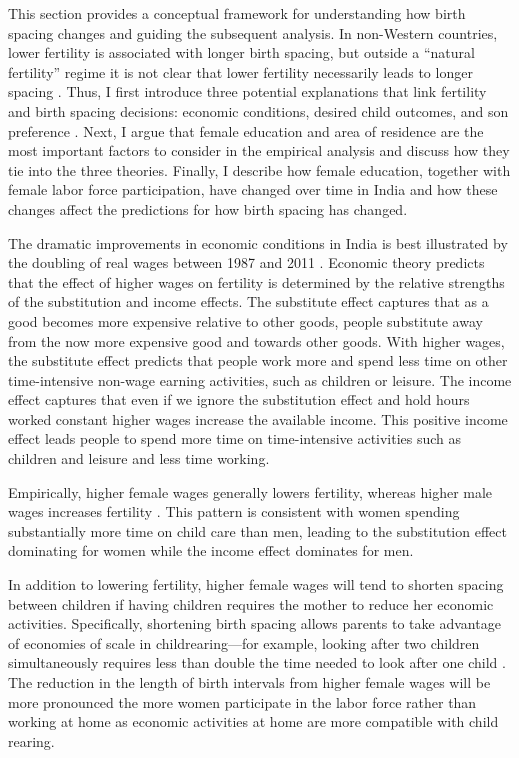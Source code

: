 This section provides a conceptual framework for understanding how birth spacing changes
and guiding the subsequent analysis.
In non-Western countries, lower fertility is associated with longer birth spacing, but 
outside a ``natural fertility'' regime it is not clear that lower fertility necessarily 
leads to longer spacing \citet{Newman1988,Rutstein2011,Casterline2016}.
Thus, I first introduce three potential explanations that link fertility and birth 
spacing decisions: economic conditions, desired child outcomes, and son preference 
\citep{Casterline2016,Portner2018}.
Next, I argue that female education and area of residence are the most important factors 
to consider in the empirical analysis and discuss how they tie into the three theories.
Finally, I describe how female education, together with female labor force participation, 
have changed over time in India and how these changes affect the predictions for how birth 
spacing has changed.

The dramatic improvements in economic conditions in India is best illustrated by the 
doubling of real wages between 1987 and 2011 \citep{Klasen2015}.
Economic theory predicts that the effect of higher wages on fertility is determined by 
the relative strengths of the substitution and income effects.
The substitute effect captures that as a good becomes more expensive relative to other
goods, people substitute away from the now more expensive good and towards other goods.
With higher wages, the substitute effect predicts that people work more and spend less 
time on other time-intensive non-wage earning activities, such as children or leisure.
The income effect captures that even if we ignore the substitution effect and hold hours 
worked constant higher wages increase the available income. 
This positive income effect leads people to spend more time on time-intensive activities 
such as children and leisure and less time working.

Empirically, higher female wages generally lowers fertility, whereas higher male 
wages increases fertility \citet{Hotz1997,schultz97}.
This pattern is consistent with women spending substantially more time on child care 
than men, leading to the substitution effect dominating for women while the income
effect dominates for men.

In addition to lowering fertility, higher female wages will tend to shorten spacing between 
children if having children requires the mother to reduce her economic activities.
Specifically, shortening birth spacing allows parents to take advantage of economies of 
scale in childrearing---for example, looking after two children simultaneously requires 
less than double the time needed to look after one child \citep{Vijverberg1982,Hotz1997}.
The reduction in the length of birth intervals from higher female wages will be more 
pronounced the more women participate in the labor force rather than working at home as 
economic activities at home are more compatible with child rearing.

